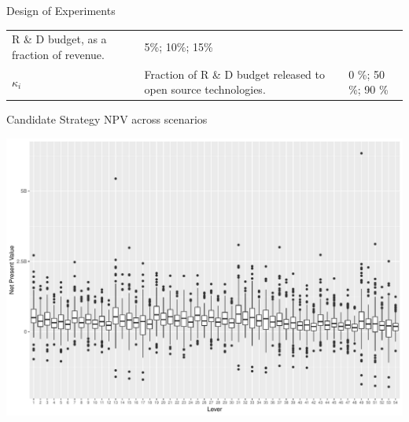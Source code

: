\documentclass[ignorenonframetext,]{beamer}
\begin{document}
\begin{frame}{Design of Experiments}
\begin{longtable}[]{@{}lll@{}}
\begin{minipage}[t]{0.47\columnwidth}
R \& D budget, as a fraction of revenue.\strut
\end{minipage} & \begin{minipage}[t]{0.30\columnwidth}\raggedright\strut
5\%; 10\%; 15\%\strut
\end{minipage}\tabularnewline
\begin{minipage}[t]{0.14\columnwidth}\raggedright\strut
\(\kappa_i\)\strut
\end{minipage} & \begin{minipage}[t]{0.47\columnwidth}\raggedright\strut
Fraction of R \& D budget released to open source technologies.\strut
\end{minipage} & \begin{minipage}[t]{0.30\columnwidth}\raggedright\strut
0 \%; 50 \%; 90 \%\strut
\end{minipage}\tabularnewline
\bottomrule
\end{longtable}

\end{frame}

\begin{frame}{Candidate Strategy NPV across scenarios}

\begin{center}\includegraphics{dmdu-presentation_files/figure-beamer/unnamed-chunk-8-1} \end{center}

\end{frame}
\end{document}
